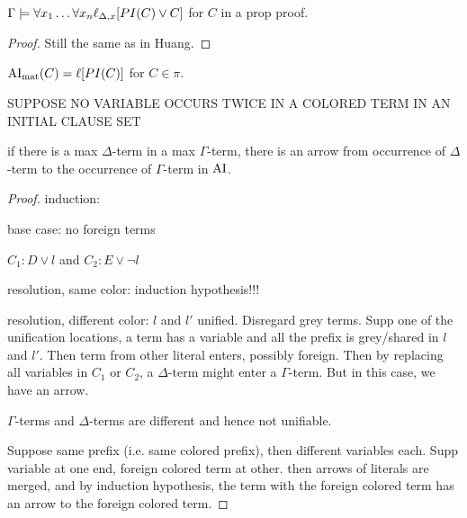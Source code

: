 \documentclass[,%
	paper=a4,%
	DIV20, 
	liststotoc,
	bibtotoc,
	draft=false,%
	numbers=noendperiod
]{scrartcl}
\begin{document}
\begin{lemma}
	$\Gamma \models \forall x_1 \ldots \forall x_n  \ell_{\Delta,x}[PI(C) \lor C]$ for $C$ in a prop proof.
	\label{structured2}
\end{lemma}
\begin{proof}
	Still the same as in Huang.
\end{proof}


\begin{lemma}
	\label{lemma:pi_ai_the_same}
	$\operatorname{AI}_\mathrm{mat}(C) = \ell[PI(C)]$ for $C \in \pi$.
\end{lemma}

SUPPOSE NO VARIABLE OCCURS TWICE IN A COLORED TERM IN AN INITIAL CLAUSE SET 

\begin{lemma}
	if there is a max $\Delta$-term in a max $\Gamma$-term, there is an arrow from occurrence of $\Delta$-term to the occurrence of $\Gamma$-term in $\operatorname{AI}$.
\end{lemma}
\begin{proof}

	induction:

	base case: no foreign terms

	$C_1: D \lor l$ and $C_2: E \lor \lnot l$

	resolution, same color: 
	induction hypothesis!!!

	resolution, different color: 
	$l$ and $l'$ unified. 
	Disregard grey terms.
	Supp one of the unification locations, a term has a variable and all the prefix is grey/shared in $l$ and $l'$.
	Then term from other literal enters, possibly foreign.
	Then by replacing all variables in $C_1$ or $C_2$, a $\Delta$-term might enter a $\Gamma$-term. But in this case, we have an arrow.

	$\Gamma$-terms and $\Delta$-terms are different and hence not unifiable.

	Suppose same prefix (i.e. same colored prefix), then different variables each. Supp variable at one end, foreign colored term at other.
	then arrows of literals are merged, and by induction hypothesis, the term with the foreign colored term has an arrow to the foreign colored term. 




\end{proof}
\end{document}
